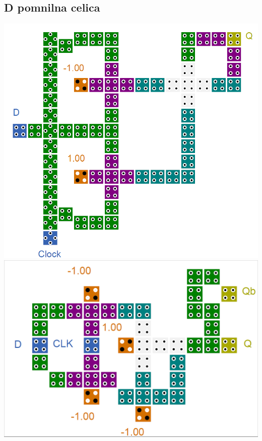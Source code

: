 \documentclass[a4paper, 11pt]{article}
\begin{document}
\subsection{D pomnilna celica}
\includegraphics[scale=0.4]{../img/vir_4/d.png} 
\includegraphics[scale=0.32]{../img/vir_5/d.png} 
\end{document}
